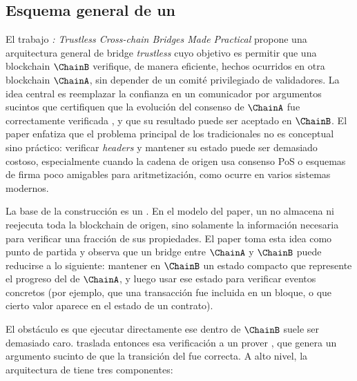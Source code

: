 
\subsection{Esquema general de un \zkBridge}

El trabajo \textit{\zkBridge: Trustless Cross-chain Bridges Made Practical} \cite{Xie2022} propone una arquitectura general de bridge \emph{trustless} cuyo objetivo es permitir que una blockchain $\ChainB$ verifique, de manera eficiente, hechos ocurridos en otra blockchain $\ChainA$, sin depender de un comité privilegiado de validadores. La idea central es reemplazar la confianza en un comunicador por argumentos sucintos que certifiquen que la evolución del consenso de $\ChainA$ fue correctamente verificada \Offchain, y que su resultado puede ser aceptado \Onchain en $\ChainB$. El paper enfatiza que el problema principal de los \LightClients tradicionales no es conceptual sino práctico: verificar \textit{headers} y mantener su estado \Onchain puede ser demasiado costoso, especialmente cuando la cadena de origen usa consenso PoS o esquemas de firma poco amigables para aritmetización, como ocurre en varios sistemas modernos.

La base de la construcción es un \LightClientProtocol. En el modelo del paper, un \LightClient no almacena ni reejecuta toda la blockchain de origen, sino solamente la información necesaria para verificar una fracción de sus propiedades. El paper toma esta idea como punto de partida y observa que un bridge entre $\ChainA$ y $\ChainB$ puede reducirse a lo siguiente: mantener en $\ChainB$ un estado compacto que represente el progreso del \LightClient de $\ChainA$, y luego usar ese estado para verificar eventos concretos (por ejemplo, que una transacción fue incluida en un bloque, o que cierto valor aparece en el estado de un contrato).

El obstáculo es que ejecutar directamente ese \LightClient dentro de $\ChainB$ suele ser demasiado caro. \zkBridge traslada entonces esa verificación a un prover \Offchain, que genera un argumento sucinto de que la transición del \LightClient fue correcta. A alto nivel, la arquitectura de \zkBridge tiene tres componentes:

